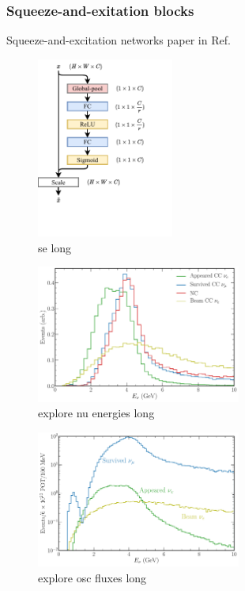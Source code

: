 \subsubsection*{Squeeze-and-exitation blocks}

Squeeze-and-excitation networks paper in Ref.~\cite{hu2018}
\begin{figure} %
    \includegraphics[width=0.4\textwidth]{diagrams/7-cvn/se.pdf}
    \caption[se short]
    {se long}
    \label{fig:se}
\end{figure}

\begin{figure} %
    \includegraphics[width=0.6\textwidth]{diagrams/7-cvn/chipsnet/explore_nu_energies.pdf}
    \caption[explore nu energies short]
    {explore nu energies long}
    \label{fig:explore_nu_energies}
\end{figure}

\begin{figure} %
    \includegraphics[width=0.6\textwidth]{diagrams/7-cvn/chipsnet/explore_osc_fluxes.pdf}
    \caption[explore osc fluxes short]
    {explore osc fluxes long}
    \label{fig:explore_osc_fluxes}
\end{figure}


